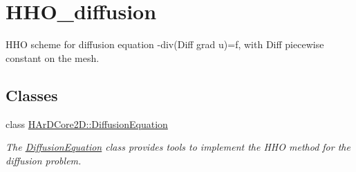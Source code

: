 \hypertarget{group__HHO__diffusion}{}\section{H\+H\+O\+\_\+diffusion}
\label{group__HHO__diffusion}


H\+HO scheme for diffusion equation -\/div(Diff grad u)=f, with Diff piecewise constant on the mesh.  


\subsection*{Classes}
\begin{DoxyCompactItemize}
\item 
class \hyperlink{classHArDCore2D_1_1DiffusionEquation}{H\+Ar\+D\+Core2\+D\+::\+Diffusion\+Equation}
\begin{DoxyCompactList}\small\item\em The \hyperlink{classHArDCore2D_1_1DiffusionEquation}{Diffusion\+Equation} class provides tools to implement the H\+HO method for the diffusion problem. \end{DoxyCompactList}\end{DoxyCompactItemize}
